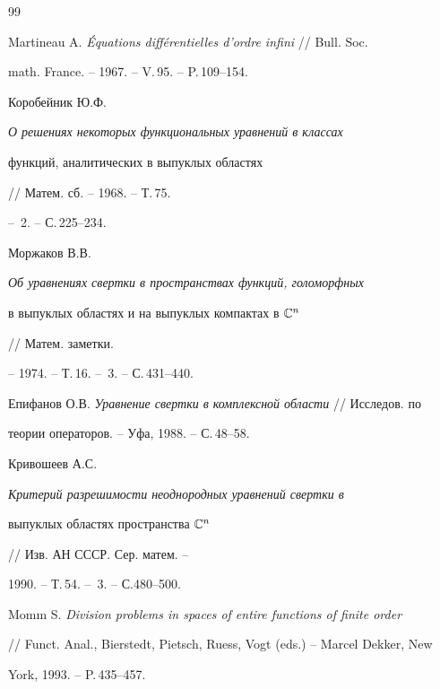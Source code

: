 \begin{thebibliography}{99} 


 




Martineau A. {\em \'Equations diff\'erentielles d'ordre infini} // Bull. Soc. 


math. France. -- 1967. -- V.\,95. -- P.\,109--154. 


 




Коробейник Ю.Ф. {\em О решениях некоторых функциональных уравнений в классах 


функций, аналитических в выпуклых областях} // Матем. сб. -- 1968. -- Т.\,75. 


-- \No\,2. -- С.\,225--234. 


 




Моржаков В.В. {\em Об уравнениях свертки в пространствах функций, голоморфных 


в выпуклых областях и на выпуклых компактах в $\Bbb C^n$} // Матем. заметки. 


-- 1974. -- Т.\,16. -- \No\,3. -- С.\,431--440. 


 




Епифанов О.В. {\em Уравнение свертки в комплексной области} // Исследов. по 


теории операторов. -- Уфа, 1988. -- С.\,48--58. 


 




Кривошеев А.С. {\em Критерий разрешимости неоднородных уравнений свертки в 


выпуклых областях пространства $\Bbb C^n$} // Изв. АН СССР. Сер. матем. -- 


1990. -- Т.\,54. -- \No\,3. -- С.480--500. 


 




Momm S. {\em Division problems in spaces of entire functions of finite order} 


// Funct. Anal., Bierstedt, Pietsch, Ruess, Vogt (eds.) -- Marcel Dekker, New 


York, 1993. -- P.\,435--457. 



\end{thebibliography}
